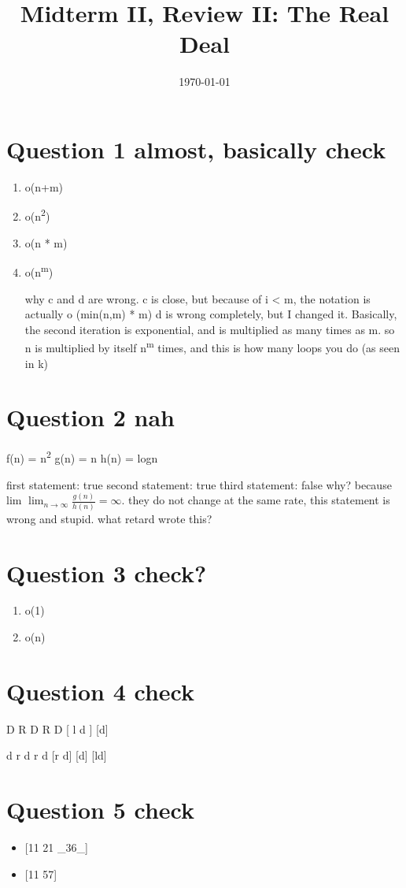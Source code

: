 \documentclass[11pt]{article}
\date{\today}
\title{Midterm II, Review II: The Real Deal}
\begin{document}
\maketitle
\tableofcontents

\section{Question 1 almost, basically check}
\label{sec:orgf3d8428}

\begin{enumerate}
\item o(n+m)
\item o(n\textsuperscript{2})
\item o(n * m)
\item o(n\textsuperscript{m})

why c and d are wrong.
c is close, but because of i < m, the notation is actually o (min(n,m) * m)
d is wrong completely, but I changed it. Basically, the second iteration is exponential, and is multiplied as many times as m. so n is multiplied by itself n\textsuperscript{m} times, and this is how many loops you do (as seen in k)
\end{enumerate}
\section{Question 2 nah}
\label{sec:org550183f}

f(n) = n\textsuperscript{2}
g(n) = n
h(n) = logn


first statement: true
 second statement: true
 third statement: false
 why? because lim \(\lim_{n \to \infty} \frac{g(n)}{h(n)} = \infty\). they do not change at the same rate, this statement is wrong and stupid. what retard wrote this?
\section{Question 3 check?}
\label{sec:orge7ca13a}
\begin{enumerate}
\item o(1)
\item o(n)
\end{enumerate}
\section{Question 4 check}
\label{sec:org2fc1d17}
D R D R D [ l d ] [d]

d r d r d [r d] [d] [ld]
\section{Question 5 check}
\label{sec:orgc320f9a}
\begin{itemize}
\item {[}11 21 \_36\_]
\item {[}11 57]
\end{itemize}
\end{document}
